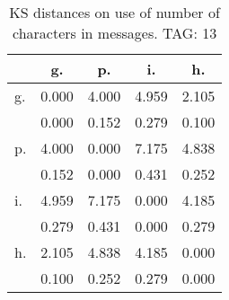 \begin{table}[h!]
\begin{center}
\begin{tabular}{| l | c | c | c | c |}\hline
 & g. & p. & i. & h. \\\hline
g. & 0.000  & 4.000  & 4.959  & 2.105 \\\hline
 & 0.000  & 0.152  & 0.279  & 0.100 \\\hline
p. & 4.000  & 0.000  & 7.175  & 4.838 \\\hline
 & 0.152  & 0.000  & 0.431  & 0.252 \\\hline
i. & 4.959  & 7.175  & 0.000  & 4.185 \\\hline
 & 0.279  & 0.431  & 0.000  & 0.279 \\\hline
h. & 2.105  & 4.838  & 4.185  & 0.000 \\\hline
 & 0.100  & 0.252  & 0.279  & 0.000 \\\hline
\end{tabular}
\caption{KS distances on use of number of characters in messages. TAG: 13}
\end{center}
\end{table}